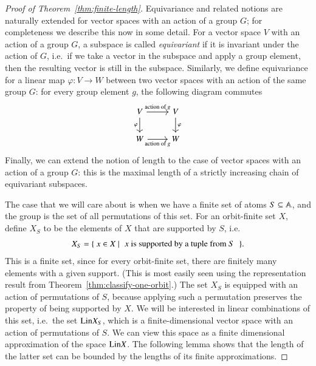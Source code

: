 \begin{proof}[Proof of Theorem~\ref{thm:finite-length}]
    Equivariance and related notions are naturally extended for vector spaces with an action of a group $G$; for completeness we describe this now in some detail. 
    For a vector space $V$ with an action of a group $G$, a subspace is called \emph{equivariant} if it is invariant under the action of $G$, i.e.~if we take a vector in the subspace and apply a group element, then the resulting vector is still in the subspace. Similarly, we define equivariance for a linear map $\varphi : V \to W$ between two vector spaces with an action of the same group $G$: for every group element $g$, the following diagram commutes 
    \[
    \begin{tikzcd}
V 
\ar[d, "\varphi"']
\ar[r, "\text{action of $g$}"]
& V 
\ar[d, "\varphi"] \\
W
\ar[r, "\text{action of $g$}"']
& W
    \end{tikzcd}
    \]
    Finally, we can extend the notion of length to the case of vector spaces with an action of a group $G$:  this is the maximal length of a strictly increasing chain of equivariant subspaces. 

    The case that we will care about is when we have a finite set of atoms $S \subseteq \mathbb A$, and the group is the set of all permutations of this set. For an orbit-finite set $X$, define $X_S$ to be the elements of $X$ that are supported by $S$, i.e.
    \begin{align*}
    X_S = 
    \setbuild{ x \in X}{$x$ is supported by a tuple from $S$}.
    \end{align*}
    This is a finite set, since for every orbit-finite set, there are finitely many elements with a given support. (This is most easily seen using the representation result from Theorem~\ref{thm:classify-one-orbit}.) 
    The set $X_S$ is equipped with an action of permutations of $S$, because applying such a permutation preserves the property of being supported by $X$. We will be interested in linear combinations of this set, i.e.~the set $\mathrm{Lin} X_S$, which is a finite-dimensional vector space with an action of permutations of $S$. We can view this space as a finite dimensional approximation of the   space $\mathrm{Lin} X$.  The following lemma shows that the length of the latter  set can be bounded by the lengths of its finite approximations. 


\end{proof}
